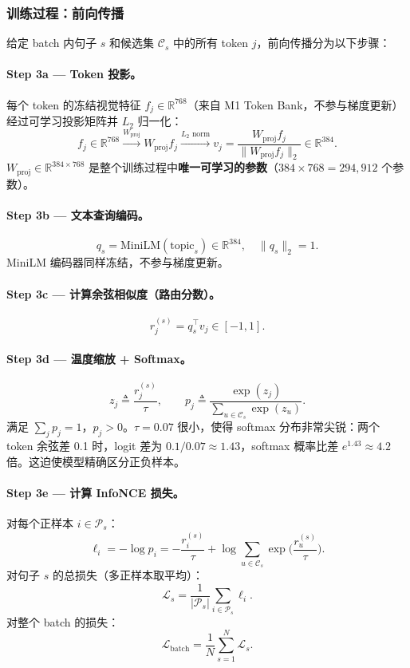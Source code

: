 \documentclass[11pt,a4paper]{article}
\newcommand{\RR}{\mathbb{R}}
\theoremstyle{definition}
\begin{document}
\subsubsection{训练过程：前向传播}

给定 batch 内句子 $s$ 和候选集 $\mathcal{C}_s$ 中的所有 token $j$，前向传播分为以下步骤：

\paragraph{Step 3a — Token 投影。}
每个 token 的冻结视觉特征 $f_j \in \RR^{768}$（来自 M1 Token Bank，不参与梯度更新）经过可学习投影矩阵并 $L_2$ 归一化：
\[
f_j \in \RR^{768} \xrightarrow{W_{\mathrm{proj}}} W_{\mathrm{proj}} f_j
\xrightarrow{L_2\text{ norm}} v_j = \frac{W_{\mathrm{proj}} f_j}{\|W_{\mathrm{proj}} f_j\|_2} \in \RR^{384}.
\]
$W_{\mathrm{proj}} \in \RR^{384 \times 768}$ 是整个训练过程中\textbf{唯一可学习的参数}（$384 \times 768 = 294{,}912$ 个参数）。

\paragraph{Step 3b — 文本查询编码。}
\[
q_s = \mathrm{MiniLM}(\mathrm{topic}_s) \in \RR^{384}, \quad \|q_s\|_2 = 1.
\]
MiniLM 编码器同样冻结，不参与梯度更新。

\paragraph{Step 3c — 计算余弦相似度（路由分数）。}
\[
r_j^{(s)} = q_s^\top v_j \in [-1, 1].
\]

\paragraph{Step 3d — 温度缩放 + Softmax。}
\begin{equation}
z_j \triangleq \frac{r_j^{(s)}}{\tau}, \qquad
p_j \triangleq \frac{\exp(z_j)}{\sum_{u \in \mathcal{C}_s} \exp(z_u)}.
\end{equation}
满足 $\sum_j p_j = 1$，$p_j > 0$。$\tau = 0.07$ 很小，使得 softmax 分布非常尖锐：两个 token 余弦差 0.1 时，logit 差为 $0.1/0.07 \approx 1.43$，softmax 概率比差 $e^{1.43} \approx 4.2$ 倍。这迫使模型精确区分正负样本。

\paragraph{Step 3e — 计算 InfoNCE 损失。}
对每个正样本 $i \in \mathcal{P}_s$：
\begin{equation}
\ell_i = -\log p_i = -\frac{r_i^{(s)}}{\tau} + \log \sum_{u \in \mathcal{C}_s} \exp\!\Big(\frac{r_u^{(s)}}{\tau}\Big).
\end{equation}
对句子 $s$ 的总损失（多正样本取平均）：
\begin{equation}
\mathcal{L}_s = \frac{1}{|\mathcal{P}_s|} \sum_{i \in \mathcal{P}_s} \ell_i.
\end{equation}
对整个 batch 的损失：
\begin{equation}
\mathcal{L}_{\mathrm{batch}} = \frac{1}{N} \sum_{s=1}^{N} \mathcal{L}_s.
\end{equation}
\end{document}
